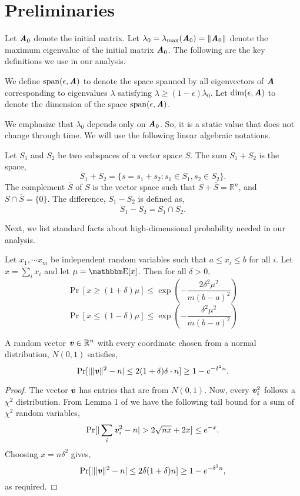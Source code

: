 
\section{Preliminaries}
\label{sec:prelims}
Let $\AA_0$ denote the initial matrix. Let $\lambda_0 = \lambda_{\max}(\AA_{0}) = \|\AA_{0}\|$ denote the maximum eigenvalue of the initial matrix $\AA_0$.
The following are the key definitions we use in our analysis.

\begin{definition} We define $\Span(\epsilon,\AA)$ to denote the space spanned by all eigenvectors of $\AA$ corresponding to eigenvalues $\lambda$ satisfying $\lambda \geq (1-\epsilon)\lambda_0$. Let $\dim{\epsilon,\AA}$ to denote the dimension of the space $\Span(\epsilon,\AA)$.
\end{definition}

We emphasize that $\lambda_0$ depends only on $\AA_0$. So, it is a static value that does not change through time. 
We will use the following linear algebraic notations.

\begin{definition}\label{def:subspace}Let $S_1$ and $S_2$ be two subspaces of a vector space $S$. The sum $S_1+S_2$ is the space,
\[
S_1+S_2 = \{s=s_1+s_2: s_1\in S_1, s_2 \in S_2\}.
\]
The complement $\overline{S}$ of $S$ is the vector space such that $S+\overline{S} = \mathbb{R}^n$, and $S\cap \overline{S} = \{0\}$. The difference, $S_1-S_2$ is defined as,
\[
S_1-S_2 = S_1\cap \overline{S_2}.
\]
\end{definition}

Next, we list standard facts about high-dimensional probability needed in our analysis.

\begin{lemma}\label{lem:Bernstein} Let $x_1,\cdots x_m$ be independent random variables such that $a\leq x_i\leq b$ for all $i$. Let $x = \sum_i x_i$ and let $\mu = \av[x]$. Then for all $\delta>0$,
\[
\Pr[x\geq(1+ \delta) \mu] \leq \exp \left(- \frac{2\delta^2\mu^2 }{m(b-a)^2} \right)
\]
\[
\Pr[x \leq (1-\delta) \mu] \leq \exp \left(- \frac{\delta^2\mu^2 }{m(b-a)^2} \right)
\]
\end{lemma}

\begin{lemma}\label{lem:NormG}
A random vector $\vv \in \mathbb{R}^n$ with every coordinate chosen from a normal distribution, $N(0,1)$ satisfies,
\[
\Pr[|\|\vv\|^2- n| \leq 2(1+\delta)\delta\cdot n ] \geq 1- e^{-\delta^2  n}.
\]
\end{lemma}
\begin{proof}
The vector $\vv$ has entries that are from $N(0,1)$. Now, every $\vv_i^2$ follows a $\chi^2$ distribution. From Lemma 1 of \cite{laurent2000adaptive} we have the following tail bound for a sum of $\chi^2$ random variables,
\[
\Pr[|\sum_i \vv^2_i - n| > 2\sqrt{nx} + 2x]\leq e^{-x}.
\]
Choosing $x = n\delta^2$ gives,
\[
\Pr[|\|\vv\|^2 - n| \leq 2\delta(1+\delta) n]\geq 1-e^{-\delta^2 n},
\] 
as required.
\end{proof}

